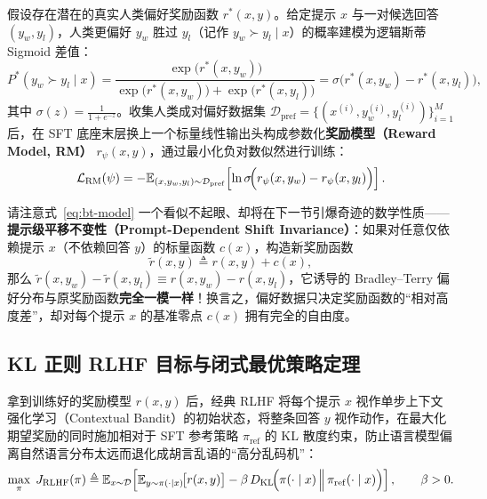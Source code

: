 \begin{defBox}
\begin{definition}
\label{def:bt-rm}
假设存在潜在的真实人类偏好奖励函数 $r^*(x, y)$。给定提示 $x$ 与一对候选回答 $(y_w, y_l)$，人类更偏好 $y_w$ 胜过 $y_l$（记作 $y_w \succ y_l \mid x$）的概率建模为逻辑斯蒂 Sigmoid 差值：
\begin{equation}
  P^*(y_w \succ y_l \mid x)
  = \frac{\exp\!\big(r^*(x, y_w)\big)}{\exp\!\big(r^*(x, y_w)\big) + \exp\!\big(r^*(x, y_l)\big)}
  = \sigma\!\Big(r^*(x, y_w) - r^*(x, y_l)\Big),
  \label{eq:bt-model}
\end{equation}
其中 $\sigma(z) = \frac{1}{1 + e^{-z}}$。收集人类成对偏好数据集 $\mathcal{D}_{\mathrm{pref}} = \{(x^{(i)}, y_w^{(i)}, y_l^{(i)})\}_{i=1}^M$ 后，在 SFT 底座末层换上一个标量线性输出头构成参数化\textbf{奖励模型（Reward Model, RM）} $r_\psi(x, y)$，通过最小化负对数似然进行训练：
\begin{equation}
  \mathcal{L}_{\mathrm{RM}}(\psi)
  = -\mathbb{E}_{(x, y_w, y_l) \sim \mathcal{D}_{\mathrm{pref}}}\!\left[\ln \sigma\!\Big(r_\psi(x, y_w) - r_\psi(x, y_l)\Big)\right].
  \label{eq:rm-loss}
\end{equation}
\end{definition}
\end{defBox}

请注意式~\eqref{eq:bt-model} 一个看似不起眼、却将在下一节引爆奇迹的数学性质——\textbf{提示级平移不变性（Prompt-Dependent Shift Invariance）}：如果对任意仅依赖提示 $x$（不依赖回答 $y$）的标量函数 $c(x)$，构造新奖励函数
\[
  \tilde{r}(x, y) \triangleq r(x, y) + c(x),
\]
那么 $\tilde{r}(x, y_w) - \tilde{r}(x, y_l) \equiv r(x, y_w) - r(x, y_l)$，它诱导的 Bradley--Terry 偏好分布与原奖励函数\textbf{完全一模一样}！换言之，偏好数据只决定奖励函数的“相对高度差”，却对每个提示 $x$ 的基准零点 $c(x)$ 拥有完全的自由度。

\subsection{KL 正则 RLHF 目标与闭式最优策略定理}

拿到训练好的奖励模型 $r(x, y)$ 后，经典 RLHF 将每个提示 $x$ 视作单步上下文强化学习（Contextual Bandit）的初始状态，将整条回答 $y$ 视作动作，在最大化期望奖励的同时施加相对于 SFT 参考策略 $\pi_{\mathrm{ref}}$ 的 KL 散度约束，防止语言模型偏离自然语言分布太远而退化成胡言乱语的“高分乱码机”：
\begin{equation}
  \max_{\pi}\; J_{\mathrm{RLHF}}(\pi)
  \triangleq \mathbb{E}_{x \sim \mathcal{D}}\!\left[
    \mathbb{E}_{y \sim \pi(\cdot \mid x)}\!\big[r(x, y)\big]
    - \beta\,D_{\mathrm{KL}}\!\Big(\pi(\cdot \mid x) \,\Big\|\, \pi_{\mathrm{ref}}(\cdot \mid x)\Big)
  \right], \qquad \beta > 0.
  \label{eq:rlhf-obj}
\end{equation}

